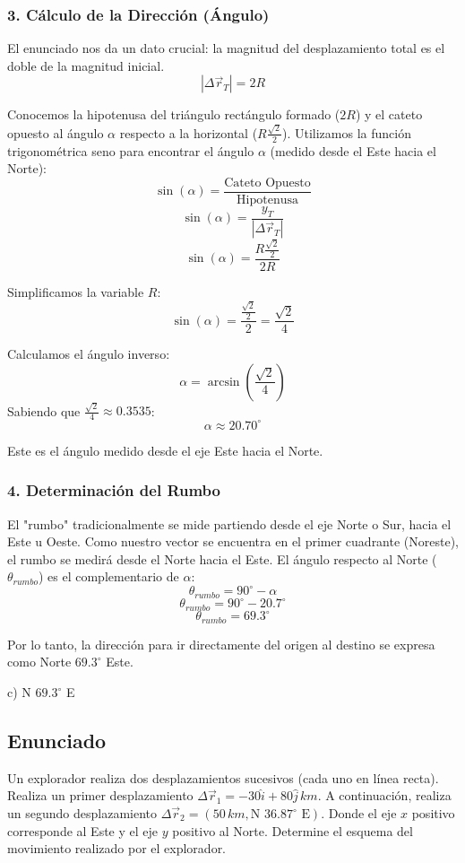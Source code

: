 \documentclass[12pt, a4paper]{article}
\begin{document}
\subsubsection*{3. Cálculo de la Dirección (Ángulo)}
El enunciado nos da un dato crucial: la magnitud del desplazamiento total es el doble de la magnitud inicial.
$$ |\Delta\vec{r}_T| = 2R $$

Conocemos la hipotenusa del triángulo rectángulo formado ($2R$) y el cateto opuesto al ángulo $\alpha$ respecto a la horizontal ($R \frac{\sqrt{2}}{2}$).
Utilizamos la función trigonométrica seno para encontrar el ángulo $\alpha$ (medido desde el Este hacia el Norte):
$$ \sin(\alpha) = \frac{\text{Cateto Opuesto}}{\text{Hipotenusa}} $$
$$ \sin(\alpha) = \frac{y_T}{|\Delta\vec{r}_T|} $$
$$ \sin(\alpha) = \frac{R \frac{\sqrt{2}}{2}}{2R} $$

Simplificamos la variable $R$:
$$ \sin(\alpha) = \frac{\frac{\sqrt{2}}{2}}{2} = \frac{\sqrt{2}}{4} $$

Calculamos el ángulo inverso:
$$ \alpha = \arcsin\left(\frac{\sqrt{2}}{4}\right) $$
Sabiendo que $\frac{\sqrt{2}}{4} \approx 0.3535$:
$$ \alpha \approx 20.70^\circ $$

Este es el ángulo medido desde el eje Este hacia el Norte.

\subsubsection*{4. Determinación del Rumbo}
El "rumbo" tradicionalmente se mide partiendo desde el eje Norte o Sur, hacia el Este u Oeste. 
Como nuestro vector se encuentra en el primer cuadrante (Noreste), el rumbo se medirá desde el Norte hacia el Este.
El ángulo respecto al Norte ($\theta_{rumbo}$) es el complementario de $\alpha$:
$$ \theta_{rumbo} = 90^\circ - \alpha $$
$$ \theta_{rumbo} = 90^\circ - 20.7^\circ $$
$$ \theta_{rumbo} = 69.3^\circ $$

Por lo tanto, la dirección para ir directamente del origen al destino se expresa como Norte $69.3^\circ$ Este.

\begin{tcolorbox}[colback=green!5!white, colframe=green!50!black, title=Respuesta Final]
\centering \Large c) N $69.3^\circ$ E
\end{tcolorbox}

\newpage

\subsection*{Enunciado}
Un explorador realiza dos desplazamientos sucesivos (cada uno en línea recta). Realiza un primer desplazamiento $\Delta\vec{r}_1 = -30\hat{i} + 80\hat{j} \, \si{km}$. A continuación, realiza un segundo desplazamiento $\Delta\vec{r}_2 = (50 \, \si{km}, \text{N } 36.87^\circ \text{ E})$. Donde el eje $x$ positivo corresponde al Este y el eje $y$ positivo al Norte. Determine el esquema del movimiento realizado por el explorador.
\end{document}
